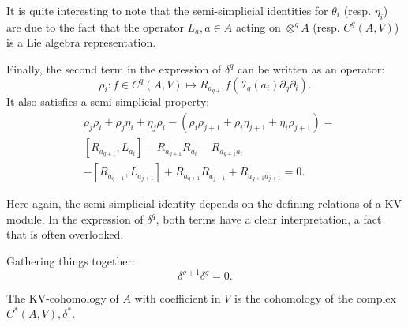 \begin{rem}
    It is quite interesting to note that the semi-simplicial identities for $\theta_i$ (resp. $\eta_i$) are due to the fact that the operator $L_a, a \in A $ acting on $\otimes^q A$ (resp. $C^q(A,V)$) is a Lie algebra representation. 
\end{rem}
Finally, the second term in the expression of $\delta^q$ can be written as an operator:
\begin{equation}
    \label{eq:rho_operator}
    \rho_i \colon f \in C^q(A,V) \mapsto R_{a_{q+1}} f\left(\mathcal{I}_q(a_i)\partial_q \partial_i\right).
\end{equation}
It also satisfies a semi-simplicial property:
\begin{equation}
    \label{eq:rho_semi_simplicial}
    \begin{split}
    &\rho_j \rho_i + \rho_j \eta_i + \eta_j \rho_i - \left( \rho_i \rho_{j+1} + \rho_i \eta_{j+1} + \eta_i \rho_{j+1} \right) = \\
    &\left[ R_{a_{q+1}},L_{a_i}\right] - R_{a_{q+1}}R_{a_i} -R_{a_{q+1}a_i}  \\
    &-\left[ R_{a_{q+1}},L_{a_{j+1}}\right] + R_{a_{q+1}}R_{a_{j+1}}+ R_{a_{q+1}a_{j+1}}  = 0.
    \end{split}
\end{equation}
\begin{rem}
Here again, the semi-simplicial identity depends on the defining relations of a KV module. In the expression of $\delta^q$, both terms have a clear interpretation, a fact that is often overlooked.
\end{rem}
Gathering things together:
\begin{equation}
    \label{eq:delta_semi_simplicial}
    \delta^{q+1}\delta^q = 0.
\end{equation}

\begin{defn}
\label{def:kv_cohomology}
The KV-cohomology of $A$ with coefficient in $V$ is the cohomology of the complex $C^*\left( A,V \right), \delta^*.$
\end{defn}
